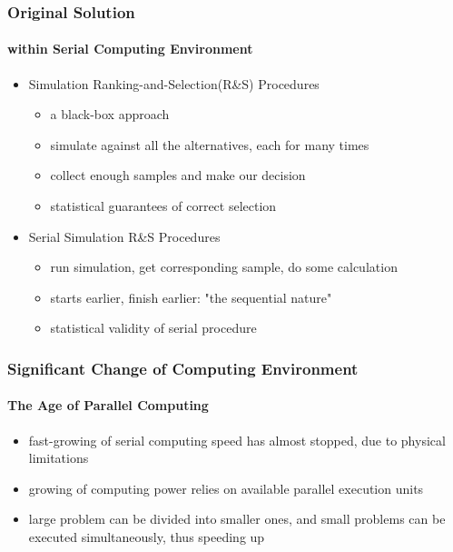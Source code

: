 \documentclass{beamer}
\begin{document}
\begin{frame}
\frametitle{Original Solution}
\framesubtitle{within Serial Computing Environment}
\begin{itemize}
\item Simulation Ranking-and-Selection(R\&S) Procedures
\begin{itemize}
\item a black-box approach
\item simulate against all the alternatives, each for many times
\item collect enough samples and make our decision
\item statistical guarantees of correct selection
\end{itemize}
\vspace{\baselineskip}
\item Serial Simulation R\&S Procedures
\begin{itemize}
\item run simulation, get corresponding sample, do some calculation
\item starts earlier, finish earlier: "the sequential nature"
\item statistical validity of serial procedure
\end{itemize}
\end{itemize}
\end{frame}

\begin{frame}
\frametitle {Significant Change of Computing Environment}
\framesubtitle{The Age of Parallel Computing}
\begin{itemize}
\item fast-growing of serial computing speed has almost stopped, due to physical limitations
\vspace{\baselineskip}
\item growing of computing power relies on available parallel execution units
\vspace{\baselineskip}
\item large problem can be divided into smaller ones, and small problems can be executed simultaneously, thus speeding up
\end{itemize}
\end{frame}
\end{document}
